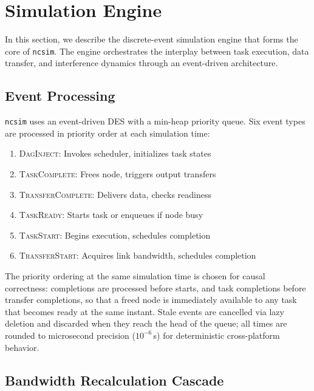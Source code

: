\documentclass[conference]{IEEEtran}
\newcommand{\ncsim}{\texttt{ncsim}}
\begin{document}
\section{Simulation Engine}
\label{sec:engine}

In this section, we describe the discrete-event simulation engine that
forms the core of \ncsim{}.  The engine orchestrates the interplay between
task execution, data transfer, and interference dynamics through an
event-driven architecture.

\subsection{Event Processing}

\ncsim{} uses an event-driven DES with a min-heap priority queue.  Six event
types are processed in priority order at each simulation time:

\begin{enumerate}[itemsep=1pt,leftmargin=*]
\item \textsc{DagInject}: Invokes scheduler, initializes task states
\item \textsc{TaskComplete}: Frees node, triggers output transfers
\item \textsc{TransferComplete}: Delivers data, checks readiness
\item \textsc{TaskReady}: Starts task or enqueues if node busy
\item \textsc{TaskStart}: Begins execution, schedules completion
\item \textsc{TransferStart}: Acquires link bandwidth, schedules completion
\end{enumerate}

The priority ordering at the same simulation time is chosen for causal
correctness: completions are processed before starts, and task
completions before transfer completions, so that a freed node is
immediately available to any task that becomes ready at the same
instant.  Stale events are cancelled via lazy deletion and discarded
when they reach the head of the queue; all times are rounded to
microsecond precision ($10^{-6}$\,s) for deterministic cross-platform
behavior.

\subsection{Bandwidth Recalculation Cascade}
\end{document}
